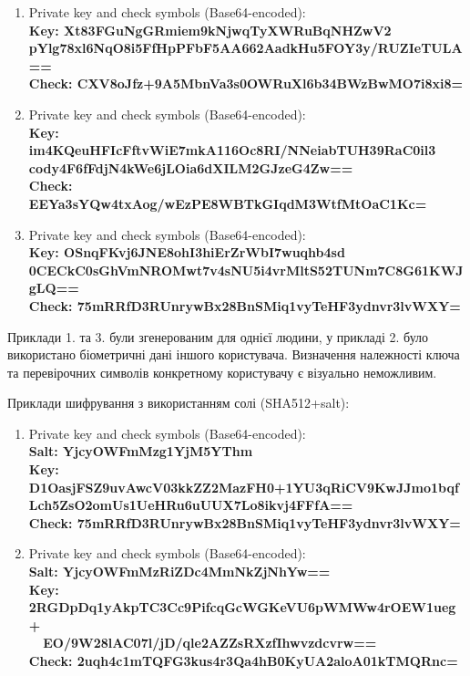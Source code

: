 \documentclass[11pt]{article}
\begin{document}
\begin{enumerate}
\def\labelenumi{\arabic{enumi}.}
  \item \text{[Gen]} Private key and check symbols (Base64-encoded):\\
  \bf{Key}\normalfont: Xt83FGuNgGRmiem9kNjwqTyXWRuBqNHZwV2\\
  pYlg78xl6NqO8i5FfHpPFbF5AA662AadkHu5FOY3y/RUZIeTULA==\\
  \bf{Check}\normalfont: CXV8oJfz+9A5MbnVa3s0OWRuXl6b34BWzBwMO7i8xi8=\\
  \item \text{[Gen]} Private key and check symbols (Base64-encoded):\\
  \bf{Key}\normalfont: im4KQeuHFIcFftvWiE7mkA116Oc8RI/NNeiabTUH39RaC0il3\\
  cody4F6fFdjN4kWe6jLOia6dXILM2GJzeG4Zw==\\
  \bf{Check}\normalfont: EEYa3sYQw4txAog/wEzPE8WBTkGIqdM3WtfMtOaC1Kc=\\
  \item \text{[Gen]} Private key and check symbols (Base64-encoded):\\
  \bf{Key}\normalfont: OSnqFKvj6JNE8ohI3hiErZrWbI7wuqhb4sd\\
  0CECkC0sGhVmNROMwt7v4sNU5i4vrMltS52TUNm7C8G61KWJgLQ==\\
  \bf{Check}\normalfont: 75mRRfD3RUnrywBx28BnSMiq1vyTeHF3ydnvr3lvWXY=\\
\end{enumerate}

Приклади 1. та 3. були згенерованим для однієї людини, у прикладі 2.
було використано біометричні дані іншого користувача. Визначення
належності ключа та перевірочних символів конкретному користувачу є
візуально неможливим.

    Приклади шифрування з використанням солі (SHA512+salt):

\begin{enumerate}
\def\labelenumi{\arabic{enumi}.}
\item \text{[Gen]} Private key and check symbols (Base64-encoded):\\
\bf{Salt}\normalfont: YjcyOWFmMzg1YjM5YThm\\
\bf{Key}\normalfont: D1OasjFSZ9uvAwcV03kkZZ2MazFH0+1YU3qRiCV9KwJJmo1bqfLch5ZsO2omUs1UeHRu6uUUX7Lo8ikvj4FFfA==\\
\bf{Check}\normalfont: 75mRRfD3RUnrywBx28BnSMiq1vyTeHF3ydnvr3lvWXY=\\
\item \text{[Gen]} Private key and check symbols (Base64-encoded):\\
\bf{Salt}\normalfont: YjcyOWFmMzRiZDc4MmNkZjNhYw==\\
\bf{Key}\normalfont: 2RGDpDq1yAkpTC3Cc9PifcqGcWGKeVU6pWMWw4rOEW1ueg+\\
$~~~~~$EO/9W28lAC07l/jD/qle2AZZsRXzfIhwvzdcvrw==\\
\bf{Check}\normalfont: 2uqh4c1mTQFG3kus4r3Qa4hB0KyUA2aloA01kTMQRnc=\\
\end{enumerate}
\end{document}
